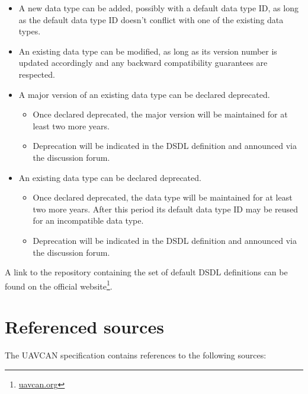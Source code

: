 \begin{itemize}
    \item A new data type can be added, possibly with a default data type ID,
    as long as the default data type ID doesn't conflict with one of the existing data types.

    \item An existing data type can be modified, as long as its version number is updated accordingly
    and any backward compatibility guarantees are respected.

    \item A major version of an existing data type can be declared deprecated.
    \begin{itemize}
        \item Once declared deprecated, the major version will be maintained for at least two more years.
        \item Deprecation will be indicated in the DSDL definition and announced via the discussion forum.
    \end{itemize}

    \item An existing data type can be declared deprecated.
    \begin{itemize}
        \item Once declared deprecated, the data type will be maintained for at least two more years.
        After this period its default data type ID may be reused for an incompatible data type.
        \item Deprecation will be indicated in the DSDL definition and announced via the discussion forum.
    \end{itemize}
\end{itemize}

A link to the repository containing the set of default DSDL definitions can be found on the official
website\footnote{\href{http://uavcan.org}{uavcan.org}}.

\section{Referenced sources}

The UAVCAN specification contains references to the following sources:

